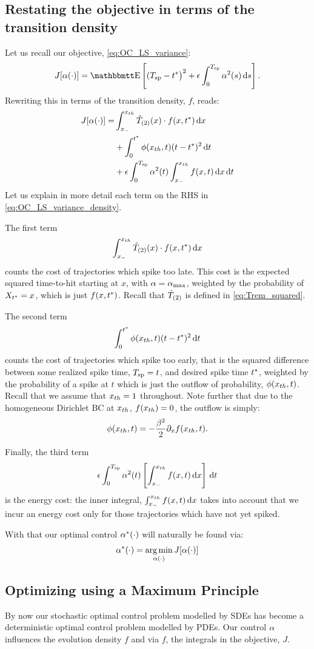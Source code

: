\documentclass[12pt]{iopart}
\begin{document}
\subsection{Restating the objective in terms of the transition density}
Let us recall our objective, \cref{eq:OC_LS_variance}:
$$
J[\a(\cdot)] = \Exp\left[
(\ts - \T \big)^2
+
\e \int_0^\ts  \a^2(s) \intd{s}
\right].
$$
Rewriting this in terms of the transition density, $f$, reads:
\begin{align}
J[{\alpha}(\cdot)] =&
\int_{ x_{-} }^{ x_{th} } { \hat{T}_{(2)} }(x) \cdot f(x,{ t^* }) \, \mathrm{d} x
\notag
\\
&+ \int_0^{ t^* } \phi({ x_{th} }, t) (t-{ t^* })^2 \, \mathrm{d} t
\label{eq:OC_LS_variance_density}
\\
&+  {\epsilon} \int_0^{ T_{\textrm{sp} } }  {\alpha}^2(t)  \int_{ x_{-} }^{ x_{th} } f(x,t) \, \mathrm{d} x \, \mathrm{d} t
\notag
\end{align}
Let us explain in more detail each term on the RHS in
\cref{eq:OC_LS_variance_density}.

The first term $$ \int_{ x_{-} }^{ x_{th} } { \hat{T}_{(2)} }(x) \cdot f(x,{ t^* })\, \mathrm{d} x $$ counts the cost of trajectories which spike too late. This cost is the expected
squared time-to-hit starting at $x$, with  ${\alpha} = { {\alpha}_{\textrm{max}} }$, weighted by the
probability of $X_{ t^* } = x$, which is just $f(x,{ t^* })$. Recall that ${ \hat{T}_{(2)} }$ is
defined in \cref{eq:Trem_squared}.

The second term $$ \int_0^{ t^* } \phi({ x_{th} },t) (t-{ t^* })^2 \, \mathrm{d} t $$ counts the cost
of trajectories which spike too early, that is the squared difference between
some realized spike time, ${ T_{\textrm{sp} } } = t$, and desired spike time ${ t^* }$, weighted by
the probability of a spike at $t$ which is just the outflow of probability,
$\phi({ x_{th} },t)$. Recall that we assume that ${ x_{th} } = 1$ throughout. Note further
that due to the homogeneous Dirichlet BC at ${ x_{th} }$, $f({ x_{th} }) = 0$, the outflow
is simply: $$ \phi({ x_{th} }, t) = -\frac{{\beta}^2 }{2} {\partial}_x f({ x_{th} }, t).$$

Finally, the third term
$$
{\epsilon} \int_0^{ T_{\textrm{sp} } }  {\alpha}^2(t)  \left[  \int_{ x_{-} }^{ x_{th} } f(x,t) \, \mathrm{d} x \right] \, \mathrm{d} t
$$
is the energy cost: the inner integral, $\int_{ x_{-} }^{ x_{th} } f(x,t) \, \mathrm{d} x$
takes into account that we incur an energy cost only for those trajectories
which have not yet spiked.

With that our optimal control ${\alpha}^*(\cdot)$ will naturally be found via:
$$
\a^*(\cdot) = \argmin_{\a(\cdot)} J[\a(\cdot)]
$$

\subsection{Optimizing using a Maximum Principle}
\label{sec:PDE_max_principle_for_pdf}
By now our stochastic optimal control problem modelled by SDEs
has become a deterministic optimal control problem modelled by PDEs. Our control
${\alpha}$ influences the evolution density $f$ and via $f$, the integrals in the
objective, $J$.
\end{document}
